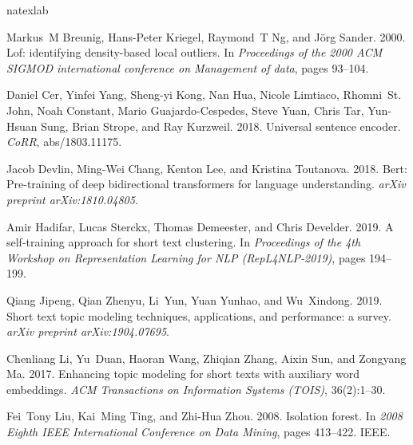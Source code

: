 \documentclass[11pt,a4paper]{article}
\begin{document}

\begin{thebibliography}{18}
\expandafter\ifx\csname natexlab\endcsname\relax\def\natexlab#1{#1}\fi

Markus~M Breunig, Hans-Peter Kriegel, Raymond~T Ng, and J{\"o}rg Sander. 2000.
\newblock Lof: identifying density-based local outliers.
\newblock In \emph{Proceedings of the 2000 ACM SIGMOD international conference
  on Management of data}, pages 93--104.

Daniel Cer, Yinfei Yang, Sheng{-}yi Kong, Nan Hua, Nicole Limtiaco, Rhomni~St.
  John, Noah Constant, Mario Guajardo{-}Cespedes, Steve Yuan, Chris Tar,
  Yun{-}Hsuan Sung, Brian Strope, and Ray Kurzweil. 2018.
\newblock Universal sentence encoder.
\newblock \emph{CoRR}, abs/1803.11175.

Jacob Devlin, Ming-Wei Chang, Kenton Lee, and Kristina Toutanova. 2018.
\newblock Bert: Pre-training of deep bidirectional transformers for language
  understanding.
\newblock \emph{arXiv preprint arXiv:1810.04805}.

Amir Hadifar, Lucas Sterckx, Thomas Demeester, and Chris Develder. 2019.
\newblock A self-training approach for short text clustering.
\newblock In \emph{Proceedings of the 4th Workshop on Representation Learning
  for NLP (RepL4NLP-2019)}, pages 194--199.

Qiang Jipeng, Qian Zhenyu, Li~Yun, Yuan Yunhao, and Wu~Xindong. 2019.
\newblock Short text topic modeling techniques, applications, and performance:
  a survey.
\newblock \emph{arXiv preprint arXiv:1904.07695}.

Chenliang Li, Yu~Duan, Haoran Wang, Zhiqian Zhang, Aixin Sun, and Zongyang Ma.
  2017.
\newblock Enhancing topic modeling for short texts with auxiliary word
  embeddings.
\newblock \emph{ACM Transactions on Information Systems (TOIS)}, 36(2):1--30.

Fei~Tony Liu, Kai~Ming Ting, and Zhi-Hua Zhou. 2008.
\newblock Isolation forest.
\newblock In \emph{2008 Eighth IEEE International Conference on Data Mining},
  pages 413--422. IEEE.


\end{thebibliography}
\end{document}
